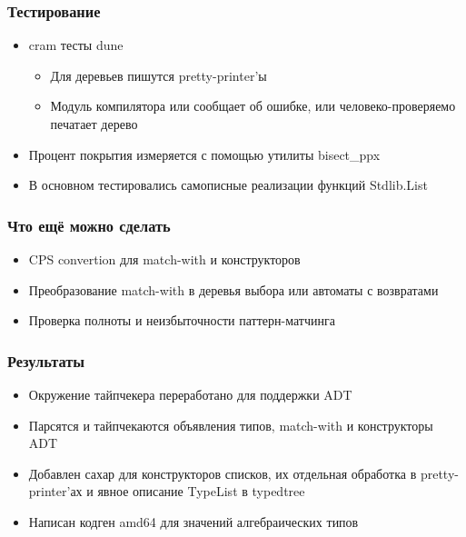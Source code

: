 \documentclass
  [ russian
  , aspectratio=43
  ] {beamer}
\begin{document}
\begin{frame}[fragile]
    \frametitle{Тестирование}
    \begin{itemize}
        \item cram тесты dune
              \begin{itemize}
                  \item Для деревьев пишутся pretty-printer'ы
                  \item Модуль компилятора или сообщает об ошибке, или человеко-проверяемо печатает дерево
              \end{itemize}
        \item Процент покрытия измеряется с помощью утилиты \texttt\small{bisect\_ppx}
        \item В основном тестировались самописные реализации функций \texttt\small{Stdlib.List}
    \end{itemize}
\end{frame}


\begin{frame}
    \frametitle{Что ещё можно сделать}
    \begin{itemize}
        \item CPS convertion для \texttt\small{match-with} и конструкторов
        \item Преобразование \texttt\small{match-with} в деревья выбора или автоматы с возвратами
        \item Проверка полноты и неизбыточности паттерн-матчинга
    \end{itemize}
\end{frame}


\begin{frame}[fragile]
    \frametitle{Результаты}
    \begin{itemize}
        \item Окружение тайпчекера переработано для поддержки ADT
        \item Парсятся и тайпчекаются объявления типов, \texttt\small{match-with} и конструкторы ADT
        \item Добавлен сахар для конструкторов списков, их отдельная обработка в pretty-printer'ах и явное описание \texttt\small{TypeList} в \texttt\small{typedtree}
        \item Написан кодген \texttt\small{amd64} для значений алгебраических типов
    \end{itemize}
\end{frame}
\end{document}
